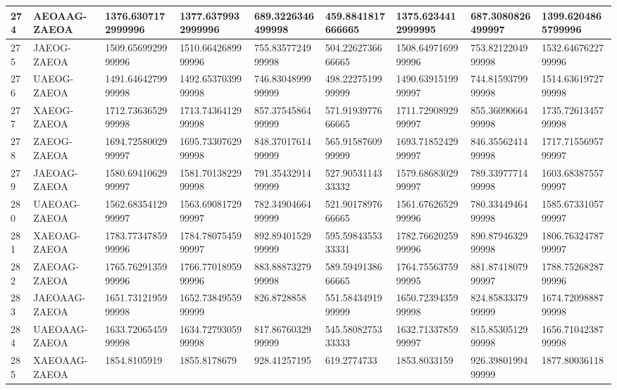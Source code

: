 {\begin{longtable}{|l|l|l|l|l|l|l|l|l|}
        274 & AEOAAG-ZAEOA & 1376.6307172999996 & 1377.6379932999996 & 689.3226346499998 & 459.8841817666665 & 1375.6234412999995 & 687.3080826499997 & 1399.6204865799996 \\ \hline
        275 & JAEOG-ZAEOA & 1509.6569929999996 & 1510.6642689999996 & 755.8357724999998 & 504.2262736666665 & 1508.6497169999996 & 753.8212204999998 & 1532.6467622799996 \\ \hline
        276 & UAEOG-ZAEOA & 1491.6464279999998 & 1492.6537039999998 & 746.8304899999999 & 498.2227519999999 & 1490.6391519999997 & 744.8159379999998 & 1514.6361972799998 \\ \hline
        277 & XAEOG-ZAEOA & 1712.7363652999998 & 1713.7436412999998 & 857.3754586499999 & 571.9193977666665 & 1711.7290892999997 & 855.3609066499998 & 1735.7261345799998 \\ \hline
        278 & ZAEOG-ZAEOA & 1694.7258002999997 & 1695.7330762999998 & 848.3701761499999 & 565.9158760999999 & 1693.7185242999997 & 846.3556241499998 & 1717.7155695799997 \\ \hline
        279 & JAEOAG-ZAEOA & 1580.6941062999997 & 1581.7013822999998 & 791.3543291499999 & 527.9053114333332 & 1579.6868302999997 & 789.3397771499998 & 1603.6838755799997 \\ \hline
        280 & UAEOAG-ZAEOA & 1562.6835412999997 & 1563.6908172999997 & 782.3490466499999 & 521.9017897666665 & 1561.6762652999996 & 780.3344946499998 & 1585.6733105799997 \\ \hline
        281 & XAEOAG-ZAEOA & 1783.7734785999996 & 1784.7807545999997 & 892.8940152999999 & 595.5984355333331 & 1782.7662025999996 & 890.8794632999998 & 1806.7632478799997 \\ \hline
        282 & ZAEOAG-ZAEOA & 1765.7629135999996 & 1766.7701895999996 & 883.8887327999998 & 589.5949138666665 & 1764.7556375999995 & 881.8741807999997 & 1788.7526828799996 \\ \hline
        283 & JAEOAAG-ZAEOA & 1651.7312195999998 & 1652.7384955999999 & 826.8728858 & 551.5843491999999 & 1650.7239435999998 & 824.8583337999999 & 1674.7209888799998 \\ \hline
        284 & UAEOAAG-ZAEOA & 1633.7206545999998 & 1634.7279305999998 & 817.8676032999999 & 545.5808275333333 & 1632.7133785999997 & 815.8530512999998 & 1656.7104238799998 \\ \hline
        285 & XAEOAAG-ZAEOA & 1854.8105919 & 1855.8178679 & 928.41257195 & 619.2774733 & 1853.8033159 & 926.3980199499999 & 1877.80036118 \\ \hline

\end{longtable}}
